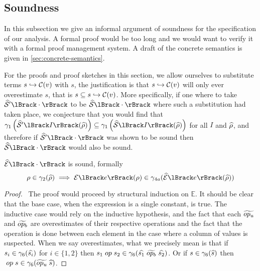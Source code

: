 \subsection{Soundness}\label{subsec:soundness}
In this subsection we give an informal argument of soundness for the specification of our analysis.
A formal proof would be too long and we would want to verify it with a formal proof management system.
A draft of the concrete semantics is given in \autoref{sec:concrete-semantics}.

For the proofs and proof sketches in this section, we allow ourselves to substitute terms $s \hookrightarrow \mathcal{C}(v)$ with $s$, the justification is that $s \hookrightarrow \mathcal{C}(v)$ will only ever overestimate $s$, that is $s \subseteq s \hookrightarrow \mathcal{C}(v)$.
More specifically, if one where to take $\ab{\mathcal{S}}'\lBrack\cdot\rBrack$ to be $\abssem{\cdot}$ where such a substitution had taken place, we conjecture that you would find that $\concrete_1 \left( \ab{\mathcal{S}}'\lBrack I \rBrack (\ab{\environment})\right) \subseteq \concrete_1 \left( \abssem{I}(\ab{\environment}) \right)$ for all $I$ and $\widehat{\rho}$, and therefore if $\ab{\mathcal{S}}'\lBrack \cdot \rBrack$ was shown to be sound then $\abssem{\cdot}$ would also be sound.

\begin{conjecture}\label{thm:sound-exp}
    $\absexpsem{\cdot}$ is sound, formally
    \begin{equation*}
        \environment \in \concrete_2(\ab{\environment}) \implies \expsem{e}(\environment) \in \concrete_{4a}(\absexpsem{e}(\ab{\environment}))
    \end{equation*}
\end{conjecture}

\begin{proof}
    \pfsketch\
    The proof would proceed by structural induction on $\mathbb{E}$.
    It should be clear that the base case, when the expression is a single constant, is true.
    The inductive case would rely on the inductive hypothesis, and the fact that each $\widetilde{op_u}$ and $\widetilde{op_b}$ are overestimates of their respective operations and the fact that the operation is done between each element in the case where a column of values is suspected.
    When we say overestimates, what we precisely mean is that if $s_i \in \gamma_6(\widehat{s_i})$ for $i \in \{1, 2\}$ then $s_1 \;op\; s_2 \in \gamma_6(\widehat{s_1} \; \widetilde{op_b} \; \widehat{s_2})$.
    Or if $s \in \gamma_6(\widehat{s})$ then $\;op\; s \in \gamma_6(\widetilde{op_u} \; \widehat{s})$.
\end{proof}


